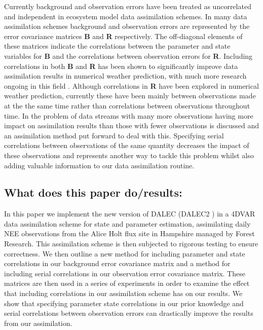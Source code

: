 \documentclass[11pt]{article}
\begin{document}
Currently background and observation errors have been treated as uncorrelated and independent in ecosystem model data assimilation schemes. In many data assimilation schemes background and observation errors are represented by the error covariance matrices \textbf{B} and \textbf{R} respectively. The off-diagonal elements of these matrices indicate the correlations between the parameter and state variables for \textbf{B} and the correlations between observation errors for \textbf{R}. Including correlations in both \textbf{B} and \textbf{R} has been shown to significantly improve data assimilation results in numerical weather prediction, with much more research ongoing in this field \citep{fisher2003background, Stewart2013}. Although correlations in \textbf{R} have been explored in numerical weather prediction, currently these have been mainly between observations made at the the same time rather than correlations between observations throughout time. In \citet{richardson2010estimating} the problem of data streams with many more observations having more impact on assimilation results than those with fewer observations is discussed and an assimilation method put forward to deal with this. Specifying serial correlations between observations of the same quantity decreases the impact of these observations and represents another way to tackle this problem whilst also adding valuable information to our data assimilation routine. 

\subsection{What does this paper do/results:}
In this paper we implement the new version of DALEC (DALEC2 \citep{Bloom2015}) in a 4DVAR data assimilation scheme for state and parameter estimation, assimilating daily NEE observations from the Alice Holt flux site in Hampshire managed by Forest Research. This assimilation scheme is then subjected to rigorous testing to ensure correctness. We then outline a new method for including parameter and state correlations in our background error covariance matrix and a method for including serial correlations in our observation error covariance matrix. These matrices are then used in a series of experiments in order to examine the effect that including correlations in our assimilation scheme has on our results. We show that specifying parameter state correlations in our prior knowledge and serial correlations between observation errors can drastically improve the results from our assimilation.
\end{document}
